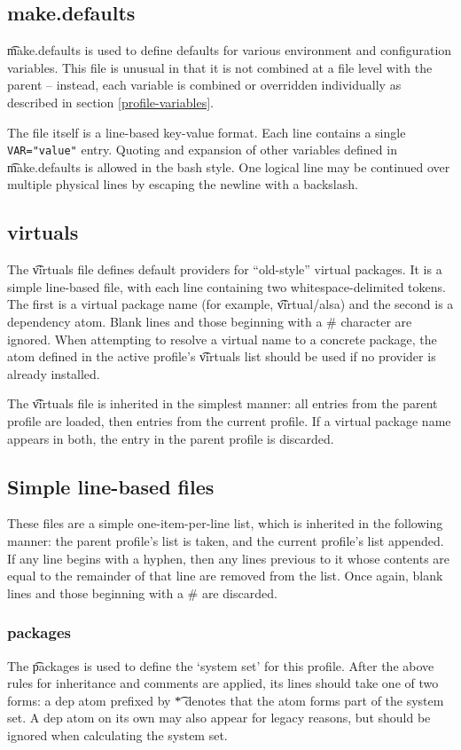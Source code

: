 \subsection{make.defaults}
\t{make.defaults} is used to define defaults for various environment and configuration variables.
This file is unusual in that it is not combined at a file level with the parent -- instead, each
variable is combined or overridden individually as described in section \ref{profile-variables}.

The file itself is a line-based key-value format. Each line contains a single \verb|VAR="value"|
entry. Quoting and expansion of other variables defined in \t{make.defaults} is allowed in the bash
style. One logical line may be continued over multiple physical lines by escaping the newline with a
backslash.

\subsection{virtuals}
The \t{virtuals} file defines default providers for ``old-style'' virtual packages. It is a simple
line-based file, with each line containing two whitespace-delimited tokens. The first is a virtual
package name (for example, \t{virtual/alsa}) and the second is a dependency atom. Blank lines and
those beginning with a \# character are ignored. When attempting to resolve a virtual name to a
concrete package, the atom defined in the active profile's \t{virtuals} list should be used if no
provider is already installed.

The \t{virtuals} file is inherited in the simplest manner: all entries from the parent profile are
loaded, then entries from the current profile. If a virtual package name appears in both, the entry
in the parent profile is discarded.

\subsection{Simple line-based files}
\label{line-stacking}
These files are a simple one-item-per-line list, which is inherited in the following manner: the
parent profile's list is taken, and the current profile's list appended. If any line begins with a
hyphen, then any lines previous to it whose contents are equal to the remainder of that line are
removed from the list. Once again, blank lines and those beginning with a \# are discarded.

\subsubsection{packages}
The \t{packages} is used to define the `system set' for this profile. After the above rules for
inheritance and comments are applied, its lines should take one of two forms: a dep atom prefixed by
\t{*} denotes that the atom forms part of the system set. A dep atom on its own may also appear for
legacy reasons, but should be ignored when calculating the system set.

